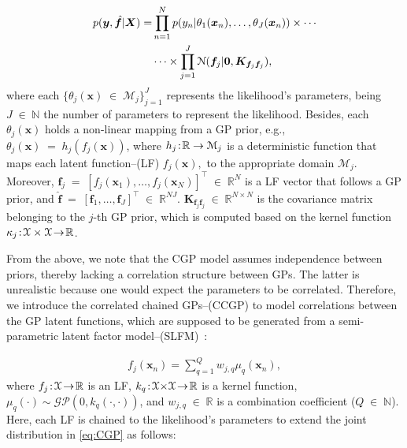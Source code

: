 \documentclass[journal]{IEEEtran}
\providecommand{\ve}[1]{{\bm{#1}}}%
\providecommand{\mat}[1]{{\bm{#1}}} %
\newcommand{\Real}{\mathbb{R}}
\DeclareMathOperator{\en}{\!\,\in\!\,}
\DeclareMathOperator{\igual}{\!\,=\!\,}
\providecommand{\s}[1]{\negthinspace#1\negthinspace}%
\providecommand{\ve}[1]{{\mathbf{#1}}}
\providecommand{\mat}[1]{{\mathbf{#1}}}
\newcommand{\gauss}{\mathcal{N}} %
\begin{document}
\begin{align}
    \notag p(\ve{y}, \hat{\ve{f}}| \mat{X}) =& \prod_{n=1}^{N}p(y_n|\theta_1(\ve{x}_n),\dots , \theta_J(\ve{x}_n))\times \cdots \\
    &\cdots \times \prod_{j=1}^{J}\gauss(\ve{f}_j|\ve{0},\mat{K}_{\ve{f}_j\ve{f}_j})\label{eq:CGP},
\end{align}
where each $\{\theta_j(\ve{x}) \en \mathcal{M}_j\}_{j=1}^{J}$ represents the likelihood's parameters, being $J\en\mathbb{N}$ the number of parameters to represent the likelihood. Besides, each $\theta_j(\ve{x})$ holds a non-linear mapping from a GP prior, e.g., $\theta_j(\ve{x})\igual h_j(f_j(\ve{x}))$, where $h_j\s{:}\Real\to \mathcal{M}_j$ is a deterministic function that maps each latent function--(LF) $f_j(\ve{x}),$ to the appropriate domain $\mathcal{M}_j$. Moreover, $\ve{f}_j\igual\left[f_j(\ve{x}_1), \dots , f_j(\ve{x}_N)\right]^{\top}\en\Real^{N}$ is a LF vector that follows a GP prior, and $\hat{\ve{f}}\igual\left[\ve{f}_1, \dots , \ve{f}_J\right]^{\top}\en \Real^{NJ}$. $\mat{K}_{\ve{f}_j\ve{f}_j} \en\Real^{N\times N}$ is the covariance matrix belonging to the $j$-th GP prior, which is computed based on the kernel function  $\kappa_{j}\s{:}\mathcal{X}\times\mathcal{X}\s{\to}\Real$.

From the above, we note that the CGP model assumes independence between priors, thereby lacking a correlation structure between GPs. The latter is unrealistic because one would expect the parameters to be correlated. Therefore, we introduce the correlated chained GPs--(CCGP) to model correlations between the GP latent functions, which are supposed to be generated from a semi-parametric latent factor model--(SLFM)~\cite{teh2005semiparametric}:

\begin{align}
\label{eq:SLFM}
f_j(\ve{x}_n) = \sum_{q=1}^{Q} w_{j,q} \mu_{q}(\ve{x}_n),
\end{align}
where $f_j\s{:}\mathcal{X}\s{\to}\Real$ is an LF, ${k}_q\s{:}\mathcal{X}{\times}\mathcal{X}\s{\to}\Real$ is a kernel function, $\mu_q(\cdot) \sim \mathcal{GP}(0,{k}_q(\cdot, \cdot))$, and $w_{j,q}\en\Real$ is a combination coefficient ($Q\en\mathbb{N}$). Here, each LF is chained to the likelihood's parameters to extend the joint distribution in \cref{eq:CGP} as follows:
\end{document}
